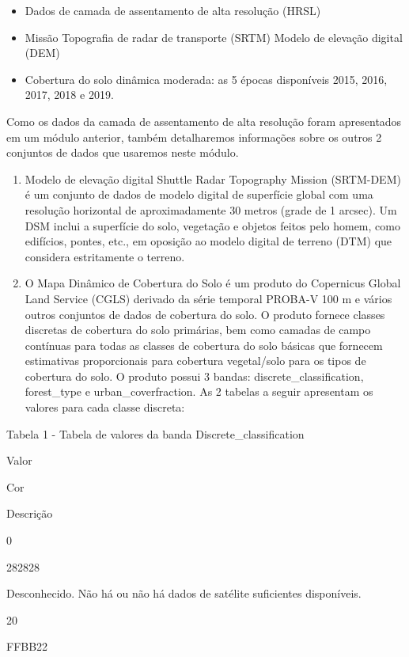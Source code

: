 \documentclass[
]{krantz}
\providecommand{\tightlist}{%
  \setlength{\itemsep}{0pt}\setlength{\parskip}{0pt}}
\begin{document}
\begin{itemize}
\tightlist
\item
  Dados de camada de assentamento de alta resolução (HRSL)
\item
  Missão Topografia de radar de transporte (SRTM) Modelo de elevação digital (DEM)
\item
  Cobertura do solo dinâmica moderada: as 5 épocas disponíveis 2015, 2016, 2017, 2018 e 2019.
\end{itemize}

Como os dados da camada de assentamento de alta resolução foram apresentados em um módulo anterior, também detalharemos informações sobre os outros 2 conjuntos de dados que usaremos neste módulo.

\begin{enumerate}
\def\labelenumi{\arabic{enumi}.}
\item
  Modelo de elevação digital Shuttle Radar Topography Mission (SRTM-DEM) é um conjunto de dados de modelo digital de superfície global com uma resolução horizontal de aproximadamente 30 metros (grade de 1 arcsec). Um DSM inclui a superfície do solo, vegetação e objetos feitos pelo homem, como edifícios, pontes, etc., em oposição ao modelo digital de terreno (DTM) que considera estritamente o terreno.
\item
  O Mapa Dinâmico de Cobertura do Solo é um produto do Copernicus Global Land Service (CGLS) derivado da série temporal PROBA-V 100 m e vários outros conjuntos de dados de cobertura do solo. O produto fornece classes discretas de cobertura do solo primárias, bem como camadas de campo contínuas para todas as classes de cobertura do solo básicas que fornecem estimativas proporcionais para cobertura vegetal/solo para os tipos de cobertura do solo. O produto possui 3 bandas: discrete\_classification, forest\_type e urban\_coverfraction. As 2 tabelas a seguir apresentam os valores para cada classe discreta:
\end{enumerate}

Tabela 1 - Tabela de valores da banda Discrete\_classification

Valor

Cor

Descrição

0

282828

Desconhecido. Não há ou não há dados de satélite suficientes disponíveis.

20

FFBB22
\end{document}
